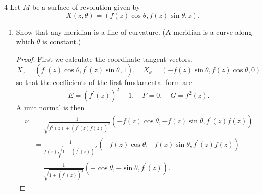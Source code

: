 \documentclass[11pt]{article}
\begin{document}
\begin{problem}{4}
	Let \( M \) be a surface of revolution given by
	\begin{equation}
		\label{eq:2}
		X(z,\theta) = (f(z)\cos\theta, f(z)\sin\theta, z).
	\end{equation}

	\begin{enumerate}[label=(\alph*)]
		\item Show that any meridian is a line of curvature.
		      (A meridian is a curve along which \(\theta\) is constant.)
		      \begin{proof}
			      First we calculate the coordinate tangent vectors,
			      \begin{equation}
				      \label{eq:10}
				      X_z = \left( f^{\prime}(z)\cos\theta, f^{\prime}(z)\sin\theta, 1 \right), \quad X_{\theta} = \left( -f(z)\sin\theta, f(z)\cos\theta, 0 \right)
			      \end{equation}
			      so that the coefficients of the first fundamental form are
			      \begin{equation}
				      \label{eq:15}
				      E = (f^{\prime}(z))^2 + 1, \quad F = 0, \quad G = f^2(z).
			      \end{equation}
            A unit normal is then
            \begin{equation}
            \label{eq:16}
            \begin{aligned}
              \nu &= \frac{1}{\sqrt{f^2(z)+(f^{\prime}(z)f(z))^2}} \left( -f(z)\cos\theta, -f(z)\sin\theta, f^{\prime}(z)f(z) \right)  \\
                &= \frac{1}{f(z) \sqrt{1 + (f^{\prime}(z))^2}} \left( -f(z)\cos\theta, -f(z)\sin\theta, f^{\prime}(z)f(z) \right) \\
              &= \frac{1}{\sqrt{1 + (f^{\prime}(z))^2}} \left( -\cos\theta, -\sin\theta, f^{\prime}(z) \right).
            \end{aligned}
          \end{equation}


\end{proof}
\end{enumerate}
\end{problem}
\end{document}
